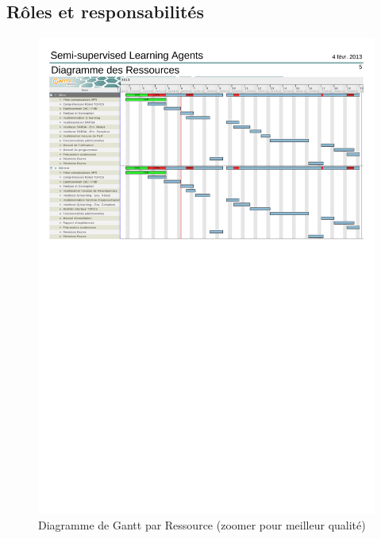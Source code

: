 \documentclass[a4paper,12pt]{article}
\begin{document}
    \subsection{Rôles et responsabilités} 
      \begin{figure}[H]
	\centerline{\includegraphics[width=20cm, clip=true, trim= 0 480 0 72]{../images/GanttR.pdf} }
	\caption{Diagramme de Gantt par Ressource \scriptsize{(zoomer pour meilleur qualité)}}
      \end{figure}
\end{document}
